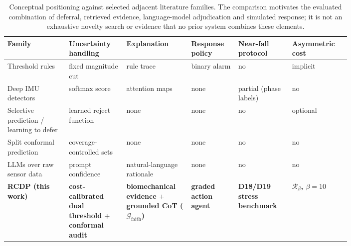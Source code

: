 \begin{table}[!t]
\centering
\caption{Conceptual positioning against selected adjacent literature families. The comparison motivates the evaluated combination of deferral, retrieved evidence, language-model adjudication and simulated response; it is not an exhaustive novelty search or evidence that no prior system combines these elements.}
\label{tab:related}
\renewcommand{\arraystretch}{1.15}
\begin{tabular}{@{}p{0.155\linewidth} p{0.135\linewidth} p{0.135\linewidth} p{0.115\linewidth} p{0.125\linewidth} p{0.135\linewidth}@{}}
\toprule
Family & Uncertainty handling & Explanation & Response policy & Near-fall protocol & Asymmetric cost \\
\midrule
Threshold rules~\cite{bourke2007threshold,nurek2020fallsurvey}
 & fixed magnitude cut & rule trace & binary alarm & no & implicit \\
Deep IMU detectors~\cite{bhatti2025beyond,kfall2021,ren2021survey}
 & softmax score & attention maps & none & partial (phase labels) & no \\
Selective prediction / learning to defer~\cite{chow1970reject,geifman2017selective,cortes2016rejection,mozannar2020defer}
 & learned reject function & none & none & no & optional \\
Split conformal prediction~\cite{vovk2005algorithmic,angelopoulos2023gentle}
 & coverage-controlled sets & none & none & no & no \\
LLMs over raw sensor data~\cite{ji2024hargpt,li2024sensorllm,kim2024healthllm}
 & prompt confidence & natural-language rationale & none & no & no \\
\midrule
\textbf{RCDP (this work)}
 & \textbf{cost-calibrated dual threshold $+$ conformal audit}
 & \textbf{biomechanical evidence $+$ grounded CoT ($\mathcal{G}_{\mathrm{faith}}$)}
 & \textbf{graded action agent}
 & \textbf{D18/D19 stress benchmark}
 & \textbf{$\mathcal{R}_\beta$, $\beta{=}10$} \\
\bottomrule
\end{tabular}
\end{table}
